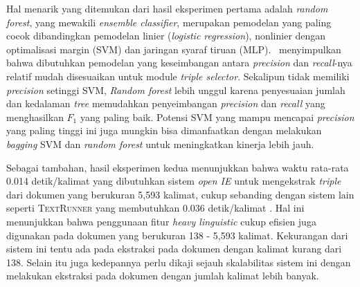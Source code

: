 Hal menarik yang ditemukan dari hasil eksperimen pertama adalah \textit{random forest}, yang mewakili \textit{ensemble classifier}, merupakan pemodelan yang paling cocok dibandingkan pemodelan linier (\textit{logistic regression}), nonlinier dengan optimalisasi margin (SVM) dan jaringan syaraf tiruan (MLP). \saya~menyimpulkan bahwa dibutuhkan pemodelan yang keseimbangan antara \textit{precision} dan \textit{recall}-nya relatif mudah disesuaikan untuk module \textit{triple selector}. Sekalipun tidak memiliki \textit{precision} setinggi SVM, \textit{Random forest} lebih unggul karena penyesuaian jumlah dan kedalaman \textit{tree} memudahkan penyeimbangan \textit{precision} dan \textit{recall} yang menghasilkan $F_1$ yang paling baik. Potensi SVM yang mampu mencapai \textit{precision} yang paling tinggi ini juga mungkin bisa dimanfaatkan dengan melakukan \textit{bagging} \citep{breiman1996bagging} SVM dan \textit{random forest} untuk meningkatkan kinerja lebih jauh.



Sebagai tambahan, hasil eksperimen kedua menunjukkan bahwa waktu rata-rata 0.014 detik/kalimat yang dibutuhkan sistem \textit{open IE} untuk mengekstrak \textit{triple} dari dokumen yang berukuran 5,593 kalimat, cukup sebanding dengan sistem lain seperti \textsc{TextRunner} yang membutuhkan 0.036 detik/kalimat \citep{banko2007open}. Hal ini menunjukkan bahwa penggunaan fitur \textit{heavy linguistic} cukup efisien juga digunakan pada dokumen yang berukuran 138 - 5,593 kalimat. Kekurangan dari sistem ini tentu ada pada ekstraksi pada dokumen dengan kalimat kurang dari 138. Selain itu juga kedepannya perlu dikaji sejauh skalabilitas sistem ini dengan melakukan ekstraksi pada dokumen dengan jumlah kalimat lebih banyak.

